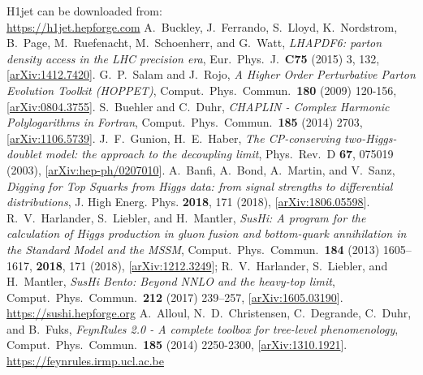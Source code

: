 \documentclass[12pt,a4wide]{article}
\begin{document}
\ifstandalone
\begin{thebibliography}{1}
    H1jet can be downloaded from: \\ \href{https://h1jet.hepforge.com}{https://h1jet.hepforge.com}
    A.\ Buckley, J.\ Ferrando, S.\ Lloyd, K.\ Nordstrom, B.\ Page, M.\ Ruefenacht, M.\ Schoenherr, and G.\ Watt, \textit{LHAPDF6: parton density access in the LHC precision era}, Eur.\ Phys.\ J.\ \textbf{C75} (2015) 3, 132, [\href{https://arxiv.org/abs/1412.7420}{arXiv:1412.7420}]. 
    G.\ P.\ Salam and J.\ Rojo, \textit{A Higher Order Perturbative Parton Evolution Toolkit (HOPPET)}, Comput.\ Phys.\ Commun.\ \textbf{180} (2009) 120-156, [\href{https://arxiv.org/abs/0804.3755}{arXiv:0804.3755}]. 
    S.\ Buehler and C.\ Duhr, \textit{CHAPLIN - Complex Harmonic Polylogarithms in Fortran}, Comput.\ Phys.\ Commun.\ \textbf{185} (2014) 2703, [\href{https://arxiv.org/abs/1106.5739}{arXiv:1106.5739}]. 
    J.\ F.\ Gunion, H.\ E.\ Haber, \textit{The CP-conserving two-Higgs-doublet model: the approach to the decoupling limit}, Phys.\ Rev.\ D \textbf{67}, 075019 (2003), [\href{https://arxiv.org/abs/hep-ph/0207010}{arXiv:hep-ph/0207010}]. 
    A.\ Banfi, A.\ Bond, A.\ Martin, and V.\ Sanz, \textit{Digging for Top Squarks from Higgs data: from signal strengths to differential distributions}, J. High Energ. Phys. \textbf{2018}, 171 (2018), [\href{https://arxiv.org/abs/1806.05598}{arXiv:1806.05598}]. 
    R.\ V.\ Harlander, S.\ Liebler, and H.\ Mantler, \textit{SusHi: A program for the calculation of Higgs production in gluon fusion and bottom-quark annihilation in the Standard Model and the MSSM}, Comput.\ Phys.\ Commun.\ \textbf{184} (2013) 1605–1617, \textbf{2018}, 171 (2018), [\href{https://arxiv.org/abs/1212.3249}{arXiv:1212.3249}]; R.\ V.\ Harlander, S.\ Liebler, and H.\ Mantler, \textit{SusHi Bento: Beyond NNLO and the heavy-top limit}, Comput.\ Phys.\ Commun.\ \textbf{212} (2017) 239–257, [\href{https://arxiv.org/abs/1605.03190}{arXiv:1605.03190}]. \\ \href{https://sushi.hepforge.org}{https://sushi.hepforge.org} 
    A.\ Alloul, N.\ D.\ Christensen, C.\ Degrande, C.\ Duhr, and B.\ Fuks, \textit{FeynRules 2.0 - A complete toolbox for tree-level phenomenology}, Comput.\ Phys.\ Commun.\ \textbf{185} (2014) 2250-2300, [\href{https://arxiv.org/abs/1310.1921}{arXiv:1310.1921}]. \\ \href{https://feynrules.irmp.ucl.ac.be}{https://feynrules.irmp.ucl.ac.be} 

\end{thebibliography}
\end{document}
